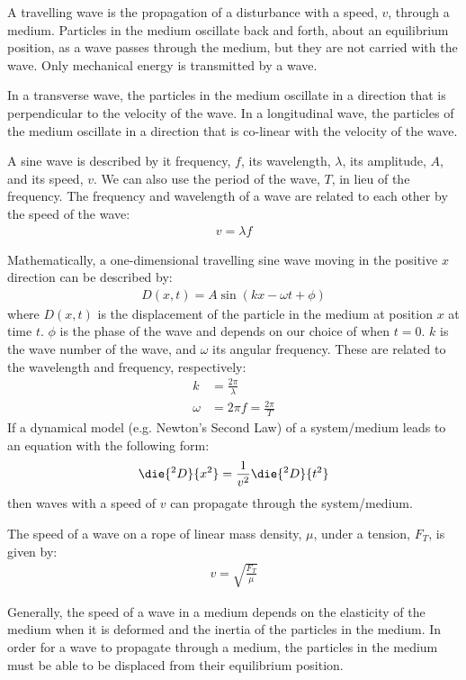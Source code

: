 \begin{chapterSummary}
A travelling wave is the propagation of a disturbance with a speed, $v$, through a medium. Particles in the medium oscillate back and forth, about an equilibrium position, as a wave passes through the medium, but they are not carried with the wave. Only mechanical energy is transmitted by a wave.

In a transverse wave, the particles in the medium oscillate in a direction that is perpendicular to the velocity of the wave. In a longitudinal wave, the particles of the medium oscillate in a direction that is co-linear with the velocity of the wave.

A sine wave is described by it frequency, $f$, its wavelength, $\lambda$, its amplitude, $A$, and its speed, $v$. We can also use the period of the wave, $T$, in lieu of the frequency. The frequency and wavelength of a wave are related to each other by the speed of the wave:
\begin{align*}
v = \lambda f
\end{align*}

Mathematically, a one-dimensional travelling sine wave moving in the positive $x$ direction can be described by:
\begin{align*}
D(x,t) = A \sin(kx-\omega t + \phi)
\end{align*}
where $D(x,t)$ is the displacement of the particle in the medium at position $x$ at time $t$. $\phi$ is the phase of the wave and depends on our choice of when $t=0$. $k$ is the wave number of the wave, and $\omega$ its angular frequency. These are related to the wavelength and frequency, respectively:
\begin{align*}
k &= \frac{2\pi}{\lambda}\\
\omega &= 2\pi f = \frac{2\pi}{T}
\end{align*}
If a dynamical model (e.g. Newton's Second Law) of a system/medium leads to an equation with the following form:
\begin{align*}
\die{^2D}{x^2}=\frac{1}{v^2}\die{^2D}{t^2}
\end{align*}
then waves with a speed of $v$ can propagate through the system/medium.

The speed of a wave on a rope of linear mass density, $\mu$, under a tension, $F_T$, is given by:
\begin{align*}
v=\sqrt{\frac{F_T}{\mu}}
\end{align*}

Generally, the speed of a wave in a medium depends on the elasticity of the medium when it is deformed and the inertia of the particles in the medium. In order for a wave to propagate through a medium, the particles in the medium must be able to be displaced from their equilibrium position.


\end{chapterSummary}
